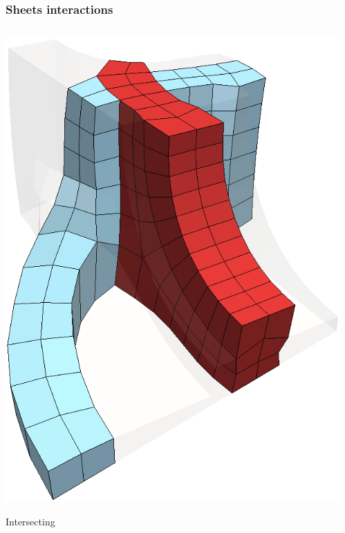 \documentclass[12pt]{beamer}
\begin{document}
\begin{frame}
  \frametitle{Sheets interactions}
  \begin{columns}
    \begin{column}{0.3\textwidth}
      \includegraphics[width=\textwidth]{./images/sheet-intersect.png}
      \begin{center}Intersecting\end{center}
    \end{column}
    \begin{column}{0.3\textwidth}

\end{column}
\end{columns}
\end{frame}
\end{document}
